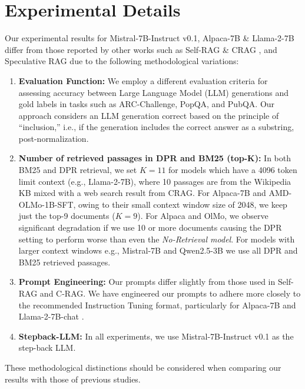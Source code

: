 \section{Experimental Details}
\label{sec:appendix4}
Our experimental results for Mistral-7B-Instruct v0.1, Alpaca-7B \& Llama-2-7B differ from those reported by other works such as Self-RAG \cite{asai2024selfrag} \& CRAG \cite{yan2024corrective}, and Speculative RAG due to the following methodological variations:
\begin{enumerate}
    \item \textbf{Evaluation Function:} We employ a different evaluation criteria for assessing accuracy between Large Language Model (LLM) generations and gold labels in tasks such as ARC-Challenge, PopQA, and PubQA. Our approach considers an LLM generation correct based on the principle of ``inclusion,'' i.e., if the generation includes the correct answer as a substring, post-normalization.
    
    \item \textbf{Number of retrieved passages in DPR and BM25 (top-K):} In both BM25 and DPR retrieval, we set $K=11$ for models which have a 4096 token limit context (e.g., Llama-2-7B), where 10 passages are from the Wikipedia KB mixed with a web search result from CRAG.
    For Alpaca-7B and AMD-OLMo-1B-SFT, owing to their small context window size of 2048, we keep just the top-9 documents ($K=9$). For Alpaca and OlMo, we observe significant degradation if we use 10 or more documents causing the DPR setting to perform worse than even the \textit{No-Retrieval model}. For models with larger context windows e.g., Mistral-7B and Qwen2.5-3B we use all DPR and BM25 retrieved passages.

    \item \textbf{Prompt Engineering:} Our prompts differ slightly from those used in Self-RAG and C-RAG. We have engineered our prompts to adhere more closely to the recommended Instruction Tuning format, particularly for Alpaca-7B \cite{alpaca} and Llama-2-7B-chat \cite{touvron2023llama2openfoundation}.
    \item \textbf{Stepback-LLM:} In all experiments, we use Mistral-7B-Instruct v0.1 as the step-back LLM.
\end{enumerate}
\noindent These methodological distinctions should be considered when comparing our results with those of previous studies.

